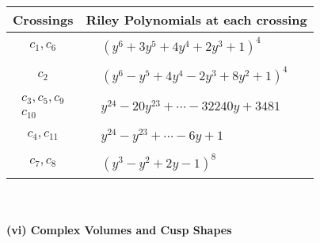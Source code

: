 \documentclass[1p]{elsarticle_modified}
\theoremstyle{definition}
\begin{document}
\begin{tabular}{m{50pt}|m{274pt}}
Crossings & \hspace{64pt}Riley Polynomials at each crossing \\
\hline $$\begin{aligned}c_{1},c_{6}\end{aligned}$$&$\begin{aligned}
&(y^6+3 y^5+4 y^4+2 y^3+1)^4
\end{aligned}$\\
\hline $$\begin{aligned}c_{2}\end{aligned}$$&$\begin{aligned}
&(y^6- y^5+4 y^4-2 y^3+8 y^2+1)^4
\end{aligned}$\\
\hline $$\begin{aligned}c_{3},c_{5},c_{9}\\c_{10}\end{aligned}$$&$\begin{aligned}
&y^{24}-20 y^{23}+\cdots-32240 y+3481
\end{aligned}$\\
\hline $$\begin{aligned}c_{4},c_{11}\end{aligned}$$&$\begin{aligned}
&y^{24}- y^{23}+\cdots-6 y+1
\end{aligned}$\\
\hline $$\begin{aligned}c_{7},c_{8}\end{aligned}$$&$\begin{aligned}
&(y^3- y^2+2 y-1)^8
\end{aligned}$\\
\hline
\end{tabular}\\~\\
\newpage\flushleft \textbf{(vi) Complex Volumes and Cusp Shapes}
\end{document}
